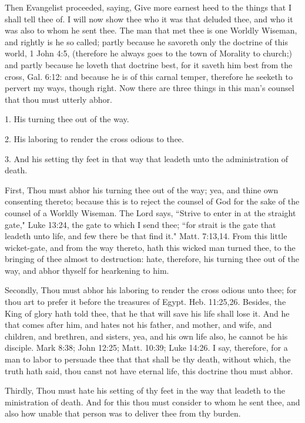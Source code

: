 Then Evangelist proceeded, saying, Give more earnest heed to the things that I shall tell thee of. I will now show thee who it was that deluded thee, and who it was also to whom he sent thee. The man that met thee is one Worldly Wiseman, and rightly is he so called; partly because he savoreth only the doctrine of this world, 1 John 4:5, (therefore he always goes to the town of Morality to church;) and partly because he loveth that doctrine best, for it saveth him best from the cross, Gal. 6:12: and because he is of this carnal temper, therefore he seeketh to pervert my ways, though right. Now there are three things in this man's counsel that thou must utterly abhor. 

1. His turning thee out of the way. 

2. His laboring to render the cross odious to thee. 

3. And his setting thy feet in that way that leadeth unto the administration of death. 

First, Thou must abhor his turning thee out of the way; yea, and thine own consenting thereto; because this is to reject the counsel of God for the sake of the counsel of a Worldly Wiseman. The Lord says, ``Strive to enter in at the straight gate," Luke 13:24, the gate to which I send thee; ``for strait is the gate that leadeth unto life, and few there be that find it." Matt. 7:13,14. From this little wicket-gate, and from the way thereto, hath this wicked man turned thee, to the bringing of thee almost to destruction: hate, therefore, his turning thee out of the way, and abhor thyself for hearkening to him. 

Secondly, Thou must abhor his laboring to render the cross odious unto thee; for thou art to prefer it before the treasures of Egypt. Heb. 11:25,26. Besides, the King of glory hath told thee, that he that will save his life shall lose it. And he that comes after him, and hates not his father, and mother, and wife, and children, and brethren, and sisters, yea, and his own life also, he cannot be his disciple. Mark 8:38; John 12:25; Matt. 10:39; Luke 14:26. I say, therefore, for a man to labor to persuade thee that that shall be thy death, without which, the truth hath said, thou canst not have eternal life, this doctrine thou must abhor. 

Thirdly, Thou must hate his setting of thy feet in the way that leadeth to the ministration of death. And for this thou must consider to whom he sent thee, and also how unable that person was to deliver thee from thy burden. 

